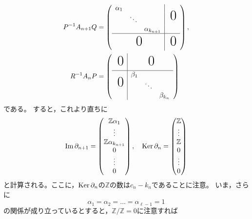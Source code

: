 \documentclass[uplatex]{jsarticle}
\begin{document}
\begin{align}
  P^{-1} A_{n+1} Q &=
    \left( \begin{array}{ccc|c}
      \alpha_{1} &        &                  & \multirow{3}{*}{\BigZero} \\
                 & \ddots &                  & \\
                 &        & \alpha_{k_{n+1}} & \\ \hline
      \multicolumn{3}{c|}{\BigZero} & \BigZero
    \end{array} \right), \\
    R^{-1} A_{n} P &=
    \left( \begin{array}{c|ccc}
      \BigZero                  & \multicolumn{3}{c}{\BigZero} \\ \hline
      \multirow{3}{*}{\BigZero} & \beta_{1} &        & \\
                                &           & \ddots & \\
                                &           &        & \beta_{k_{n}} \\
    \end{array} \right)
\end{align}
である。
すると，これより直ちに
\begin{equation}
  \operatorname{Im} \partial_{n+1} = \begin{pmatrix}
    \mathbb{Z} \alpha_{1} \\ \vdots \\ \mathbb{Z} \alpha_{k_{n+1}} \\ 0 \\ \vdots \\ 0
  \end{pmatrix}, \quad 
  \operatorname{Ker} \partial_{n} = \begin{pmatrix}
    \mathbb{Z} \\ \vdots \\ \mathbb{Z} \\ 0 \\ \vdots \\ 0
  \end{pmatrix}
\end{equation}
と計算される。ここに，$\operatorname{Ker} \partial_{n}$の$\mathbb{Z}$の数は$c_{n} - k_{n}$であることに注意。
いま，さらに
\begin{equation}
  \alpha_{1} = \alpha_{2} = \dots = \alpha_{\ell-1} = 1
\end{equation}
の関係が成り立っているとすると，$\mathbb{Z} / \mathbb{Z} = 0$に注意すれば
\end{document}
